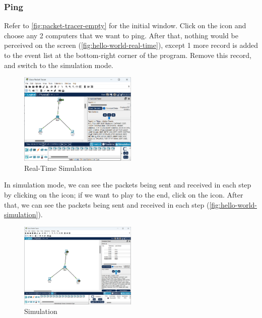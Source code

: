 \subsubsection{Ping}

Refer to \autoref{fig:packet-tracer-empty} for the initial window. Click on the
 icon and choose any 2 computers that we want to ping. After
that, nothing would be perceived on the screen
(\autoref{fig:hello-world-real-time}), except 1 more record is added to the
event list at the bottom-right corner of the program. Remove this record, and
switch to the simulation mode.

\begin{figure}
    \centering
    \includegraphics[width=0.5\textwidth]{images/hello-world-real-time.png}
    \caption{Real-Time Simulation}\label{fig:hello-world-real-time}
\end{figure}

In simulation mode, we can see the packets being sent and received in each step
by clicking on the  icon; if we want to play to the end, click on the
 icon. After that, we can see the packets being sent and received in
each step (\autoref{fig:hello-world-simulation}).

\begin{figure}
    \centering
    \includegraphics[width=0.5\textwidth]{images/hello-world-simulation.png}
    \caption{Simulation}\label{fig:hello-world-simulation}
\end{figure}

